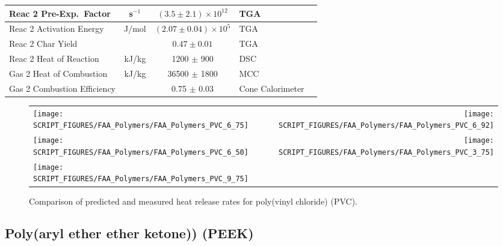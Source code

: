 \begin{table}[h!]
\begin{center}
\begin{tabular}{|l|c|c|l|l|}
Reac 2 Pre-Exp.~Factor      & s$^{-1}$      & $(3.5 \pm 2.1) \times 10^{12}$    & TGA                       &  \cite{Stoliarov:CF2010}                  \\ \hline
Reac 2 Activation Energy    & J/mol       & $(2.07 \pm 0.04) \times 10^{5}$   & TGA                       &  \cite{Stoliarov:CF2010}                  \\ \hline
Reac 2 Char Yield           &               & $0.47 \pm 0.01$                   & TGA                       &  \cite{Stoliarov:CF2010}                  \\ \hline
Reac 2 Heat of Reaction     & kJ/kg         & 1200 $\pm$ 900                    & DSC                       &  \cite{Stoliarov:PDS2008}                 \\ \hline
Gas 2 Heat of Combustion    & kJ/kg         & 36500 $\pm$ 1800                  & MCC                       &  \cite{Stoliarov:CF2010}                  \\ \hline
Gas 2 Combustion Efficiency &               & 0.75 $\pm$ 0.03                   & Cone Calorimeter          &  \cite{Stoliarov:CF2010}                  \\ \hline
\end{tabular}
\end{center}
\label{Properties_PVC}
\end{table}

\begin{figure}[p]
\begin{tabular*}{\textwidth}{l@{\extracolsep{\fill}}r}
\texttt{[image: SCRIPT\_FIGURES/FAA\_Polymers/FAA\_Polymers\_PVC\_6\_75]} &
\texttt{[image: SCRIPT\_FIGURES/FAA\_Polymers/FAA\_Polymers\_PVC\_6\_92]} \\
\texttt{[image: SCRIPT\_FIGURES/FAA\_Polymers/FAA\_Polymers\_PVC\_6\_50]} &
\texttt{[image: SCRIPT\_FIGURES/FAA\_Polymers/FAA\_Polymers\_PVC\_3\_75]} \\
\texttt{[image: SCRIPT\_FIGURES/FAA\_Polymers/FAA\_Polymers\_PVC\_9\_75]} &
\end{tabular*}
\caption[Heat release rate of poly(vinyl chloride) (PVC).]{Comparison of predicted and measured heat release rates for poly(vinyl chloride) (PVC).}
\label{HRR_PVC}
\end{figure}

\clearpage



\subsection{Poly(aryl ether ether ketone)) (PEEK)}

